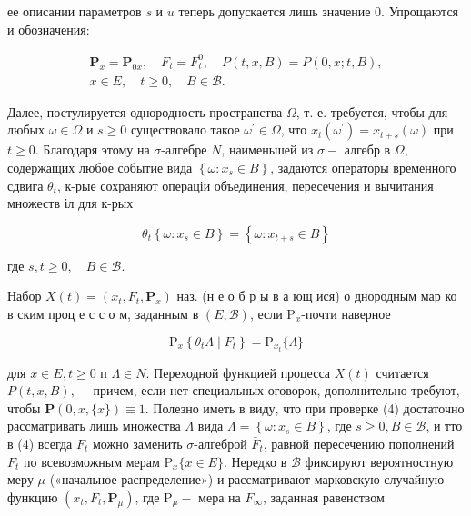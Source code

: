 \documentclass[10pt]{article}
\begin{document}
ее описании параметров $s$ и $u$ теперь допускается лишь значение 0. Упрощаются и обозначения:



\[

\begin{gathered}

\mathbf{P}_{x}=\mathbf{P}_{0 x}, \quad F_{t}=F_{t}^{0}, \quad P(t, x, B)=P(0, x ; t, B), \\

x \in E, \quad t \geqslant 0, \quad B \in \mathscr{B} .

\end{gathered}

\]



Далее, постулируется однородность пространства $\Omega$, т. е. требуется, чтобы для любых $\omega \in \Omega$ и $s \geqslant 0$ существовало такое $\omega^{\prime} \in \Omega$, что $x_{t}\left(\omega^{\prime}\right)=x_{t+s}(\omega)$ при $t \geqslant 0$. Благодаря этому на $\sigma$-алгебре $N$, наименьшей из $\sigma-$ алгебр в $\Omega$, содержащих любое событие вида $\left\{\omega: x_{s} \in B\right\}$, задаются операторы временного сдвига $\theta_{t}$, к-рые сохраняют операціи объединения, пересечения и вычитания множеств іл для к-рых



\[

\theta_{t}\left\{\omega: x_{s} \in B\right\}=\left\{\omega: x_{t+s} \in B\right\}

\]



где $s, t \geqslant 0, \quad B \in \mathscr{B}$.



Набор $X(t)=\left(x_{t}, F_{t}, \mathbf{P}_{x}\right)$ наз. (н е о б р ы в а ющ ися) о днородным мар ко в ским проц е с с о м, заданным в $(E, \mathscr{B})$, если $\mathrm{P}_{x}$-почти наверное



\[

\mathrm{P}_{x}\left\{\theta_{t} \Lambda \mid F_{t}\right\}=\mathrm{P}_{x_{t}}\{\Lambda\}

\]



для $x \in E, t \geqslant 0$ п $\Lambda \in N$. Переходной функцией процесса $X(t)$ считается $P(t, x, B), \quad$ причем, если нет специальных оговорок, дополнительно требуют, чтобы $\boldsymbol{P}(0, x,\{x\}) \equiv 1$. Полезно иметь в виду, что при проверке (4) достаточно рассматривать лишь множества $\Lambda$ вида $\Lambda=\left\{\omega: x_{s} \in B\right\}$, где $s \geqslant 0, B \in \mathscr{B}$, и тто в (4) всегда $F_{t}$ можно заменить $\sigma$-алгеброй $\bar{F}_{t}$, равной пересечению пополнений $F_{t}$ по всевозможным мерам $\mathrm{P}_{x}\{x \in E\}$. Нередко в $\mathscr{B}$ фиксируют вероятностную меру $\mu$ («начальное распределение») и рассматривают марковскую случайную функцию $\left(x_{t}, F_{t}, \mathbf{P}_{\mu}\right)$, где $\mathrm{P}_{\mu}-$ мера на $F_{\infty}$, заданная равенством
\end{document}
